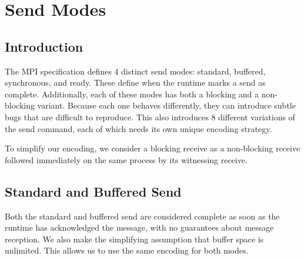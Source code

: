 \section{Send Modes}

\subsection{Introduction}
The MPI specification defines 4 distinct send modes: standard, buffered,
synchronous, and ready. These define when the runtime marks a send as complete.
Additionally, each of these modes has both a blocking and a non-blocking
variant.
Because each one behaves differently, they can introduce subtle bugs that
are difficult to reproduce. 
This also introduces 8 different variations of the send command, each of which
needs its own unique encoding strategy.

To simplify our encoding, we consider a blocking receive as a non-blocking
receive followed immediately on the same process by its witnessing receive.

\subsection{Standard and Buffered Send}
Both the standard and buffered send are considered complete as soon as the
runtime has acknowledged the message, with no guarantees about message
reception. We also make the simplifying assumption that buffer space is
unlimited. This allows us to use the same encoding for both modes.

